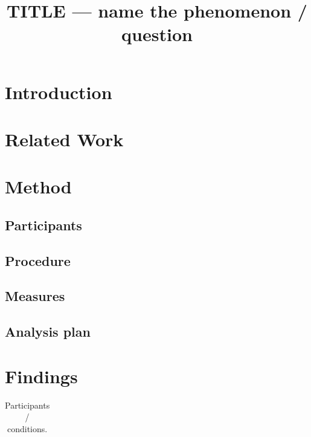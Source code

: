 \documentclass[sigconf,review,anonymous]{acmart}
\begin{document}
\title{TITLE — name the phenomenon / question}
\begin{abstract}
\end{abstract}
\maketitle

\section{Introduction}

\section{Related Work}

\section{Method}
\subsection{Participants}
\subsection{Procedure}
\subsection{Measures}
\subsection{Analysis plan}

\section{Findings}
\begin{table}[t]\centering\caption{Participants / conditions.}
\begin{tabular}{lll}\toprule & & \\ \bottomrule\end{tabular}\end{table}
\end{document}
